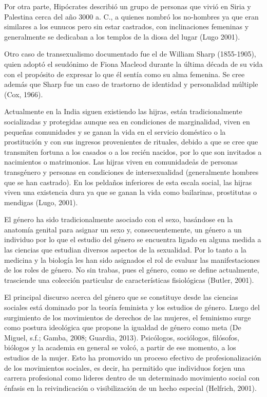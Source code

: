 Por otra parte, Hipócrates describió un grupo de personas que vivió en Siria
y Palestina cerca del año 3000 a. C., a quienes nombró los no-hombres ya que
eran  similares a los eunucos pero sin estar castrados, con inclinaciones
femeninas y generalmente se dedicaban a los templos de la diosa del lugar (Lugo
2001).

Otro caso de transexualismo documentado fue el de William Sharp (1855-1905),
quien adoptó el seudónimo de Fiona Macleod durante la última década de su vida
con el propósito de expresar lo que él sentía como su alma femenina.
Se cree además que Sharp fue un caso de trastorno de identidad y personalidad
múltiple (Cox, 1966).

Actualmente en la India siguen existiendo las hijras, están tradicionalmente
socializadas y protegidas aunque sea en condiciones de marginalidad, viven en
pequeñas comunidades y se ganan la vida en el servicio doméstico o la
prostitución y con sus ingresos provenientes de rituales, debido a que se cree
que transmiten fortuna a los casados o a los recién nacidos, por lo que son
invitados a nacimientos o matrimonios.
Las hijras viven en comunidadeås de personas transgénero y personas en
condiciones de intersexualidad (generalmente hombres que se han castrado).
En los peldaños inferiores de esta escala social, las hijras viven una
existencia dura ya que se ganan la vida como bailarinas, prostitutas o mendigas
(Lugo, 2001).

El género ha sido tradicionalmente asociado con el sexo, basándose en la
anatomía genital para asignar un sexo y, consecuentemente, un género a un
individuo por lo que el estudio del género se encuentra ligado en alguna medida
a las ciencias que estudian diversos aspectos de la sexualidad.
Por lo tanto a la medicina y la biología les han sido asignados el rol de
evaluar las manifestaciones de los roles de género.
No sin trabas, pues el género, como se define actualmente, trasciende una
colección particular de características fisiológicas (Butler, 2001).

El principal discurso acerca del género que se constituye desde las ciencias
sociales está dominado por la teoría feminista y los estudios de género.
Luego del surgimiento de los movimientos de derechos de las mujeres, el
feminismo surge como postura ideológica que propone la igualdad de género como
meta (De Miguel, s.f.; Gamba, 2008; Guardia, 2013).
Psicólogos, sociólogos, filósofos, biólogos y la academia en general se volcó, a
partir de ese momento, a los estudios de la mujer.
Esto ha promovido un proceso efectivo de profesionalización de los movimientos
sociales, es decir, ha permitido que individuos forjen una carrera profesional
como lideres dentro de un determinado movimiento social con énfasis en la
reivindicación o visibilización de un hecho especial (Helfrich, 2001).


